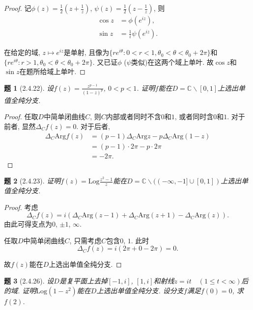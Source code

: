 \documentclass{article}[a4paper, 12pt]
\newtheorem{problem}{题}
\begin{document}
\begin{proof}
  记\(\phi(z)=\frac12(z+\frac1z)\), \(\psi(z)=\frac12(z-\frac1z)\), 则\begin{align*}
    \cos z&=\phi(e^{iz}),\\
    \sin z&=\frac1i\psi(e^{iz}).
  \end{align*}

  在给定的域, \(z\mapsto e^{iz}\)是单射, 且像为\(\{re^{i\theta}:0<r<1,\theta_0<\theta<\theta_0+2\pi\}\)和\(\{re^{i\theta}:r>1,\theta_0<\theta<\theta_0+2\pi\}\). 又已证\(\phi\) (\(\psi\)类似)在这两个域上单叶. 故\(\cos z\)和\(\sin z\)在题所给域上单叶.
\end{proof}

\begin{problem}[2.4.22]
  设\(f(z)=\frac{z^{p-1}}{(1-z)^p}\), \(0<p<1\). 证明\(f\)能在\(D=\mathbb{C}\backslash[0,1]\)上选出单值全纯分支.
\end{problem}

\begin{proof}
  任取\(D\)中简单闭曲线\(C\), 则\(C\)内部或者同时不含\(0\)和\(1\), 或者同时含\(0\)和\(1\). 对于前者, 显然\(\Delta_C f(z)=0\). 对于后者, \begin{align*}
    \Delta_C \mathrm{Arg}f(z)
    &=(p-1)\Delta_C\mathrm{Arg}z-p\Delta_C\mathrm{Arg}(1-z)\\
    &=(p-1)\cdot2\pi-p\cdot2\pi\\
    &=-2\pi.
  \end{align*}
\end{proof}

\begin{problem}[2.4.23]
  证明\(f(z)=\mathrm{Log}\frac{z^2-1}{z}\)能在\(D=\mathbb{C}\backslash((-\infty,-1]\cup[0,1])\)上选出单值全纯分支.
\end{problem}

\begin{proof}
  考虑\[\Delta_C f(z)=i\left(\Delta_C\mathrm{Arg}(z-1)+\Delta_C\mathrm{Arg}(z+1)-\Delta_C\mathrm{Arg}(z)\right).\]
  由此可得支点为\(0\), \(\pm 1\), \(\infty\).

  任取\(D\)中简单闭曲线\(C\), 只需考虑\(C\)包含\(0\), \(1\). 此时
  \[\Delta_C f(z)=i(2\pi+0-2\pi)=0.\]

  故\(f(z)\)能在\(D\)上选出单值全纯分支.
\end{proof}

\begin{problem}[2.4.26]
  设\(D\)是复平面上去掉\([-1,i]\), \([1,i]\)和射线\(z=it\quad(1\le t<\infty)\)后的域. 证明\(\mathrm{Log}(1-z^2)\)能在\(D\)上选出单值全纯分支. 设分支\(f\)满足\(f(0)=0\), 求\(f(2)\).
\end{problem}
\end{document}
